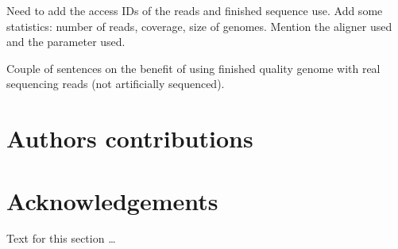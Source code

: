 \documentclass[10pt]{bmc_article}
\newenvironment{bmcformat}{\fussy\setboolean{publ}{true}}{\fussy}
\begin{document}
\begin{bmcformat}
Need to add the access IDs of the reads and finished sequence use. Add some statistics: number of reads, coverage, size of genomes.
Mention the aligner used and the parameter used.

Couple of sentences on the benefit of using finished quality genome with real sequencing reads (not artificially sequenced).
    
\section*{Authors contributions}


    

\section*{Acknowledgements}
  Text for this section \ldots


 


{
  
}     %





\end{bmcformat}
\end{document}
